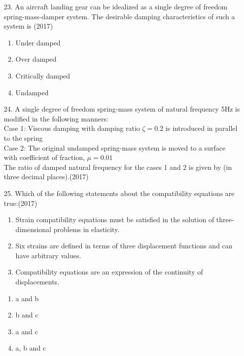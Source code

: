\documentclass[journal]{IEEEtran}
\begin{document}
\begin{enumerate}
    \item[23.] An aircraft landing gear can be idealized as a single degree of freedom spring-mass-damper system. The desirable damping characteristics of such a system is  \hfill (2017)
     \begin{enumerate}[label=(\Alph*)]
        \item Under damped
        \item Over damped
        \item Critically damped
        \item Undamped
     \end{enumerate}
    \item[24.] A single degree of freedom spring-mass system of natural frequency 5Hz is modified in the following manners:
    \\ Case 1: Viscous damping with damping ratio $\zeta = 0.2$ is introduced in parallel to the spring
    \\ Case 2: The original undamped spring-mass system is moved to a surface with coefficient of fraction, $\mu = 0.01$\\
    The ratio of damped natural frequency for the cases 1 and 2 is given by (in three decimal places).\hfill (2017)
    \item[25.]  Which of the following statements about the compatibility equations are true:\hfill (2017)
    \begin{enumerate}
        \item Strain compatibility equations must be satisfied in the solution of three-dimensional problems in elasticity.
        \item Six strains are defined in terms of three displacement functions and can have arbitrary values.
        \item Compatibility equations are an expression of the continuity of displacements.
    \end{enumerate}
    \begin{enumerate}[label=(\Alph*)]
        \item a and b 
        \item b and c 
        \item a and c 
        \item a, b and c 
    \end{enumerate}
    

\end{enumerate}
\end{document}
